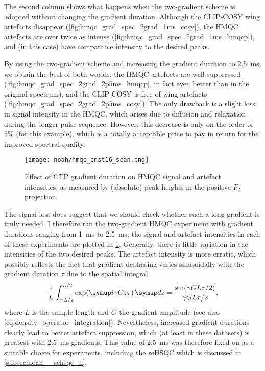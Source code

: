 The second column shows what happens when the two-gradient scheme is adopted without changing the gradient duration.
Although the CLIP-COSY wing artefacts disappear (\cref{fig:hmqc_grad_spec_2grad_1ms_cosy}), the HMQC artefacts are over twice as intense (\cref{fig:hmqc_grad_spec_2grad_1ms_hmqcp}), and (in this case) have comparable intensity to the desired peaks.

By using the two-gradient scheme and increasing the gradient duration to \qty{2.5}{\ms}, we obtain the best of both worlds: the HMQC artefacts are well-suppressed (\cref{fig:hmqc_grad_spec_2grad_2p5ms_hmqcp}, in fact even better than in the original spectrum), and the CLIP-COSY is free of wing artefacts (\cref{fig:hmqc_grad_spec_2grad_2p5ms_cosy}).
The only drawback is a slight loss in signal intensity in the HMQC, which arises due to diffusion and relaxation during the longer pulse sequence.
However, this decrease is only on the order of $5\%$ (for this example), which is a totally acceptable price to pay in return for the improved spectral quality.

\begin{figure}[!ht]
    \centering
    \texttt{[image: noah/hmqc\_cnst16\_scan.png]}%
    \caption[Effect of CTP gradient duration on \nitrogen{} HMQC signal and artefact intensities]{
        Effect of CTP gradient duration on \nitrogen{} HMQC signal and artefact intensities, as measured by (absolute) peak heights in the positive $F_2$ projection.
    }
    \label{fig:hmqc_cnst16}
\end{figure}

The signal loss does suggest that we should check whether such a long gradient is truly needed.
I therefore ran the two-gradient HMQC experiment with gradient durations ranging from \qty{1}{\ms} to \qty{2.5}{\ms}; the signal and artefact intensities in each of these experiments are plotted in \cref{fig:hmqc_cnst16}.
Generally, there is little variation in the intensities of the two desired peaks.
The artefact intensity is more erratic, which possibly reflects the fact that gradient dephasing varies sinusoidally with the gradient duration $\tau$ due to the spatial integral
\begin{equation}
    \label{eq:gradient_dephasing}
    \frac{1}{L} \int_{-L/2}^{L/2} \exp(\mi \gamma Gz\tau)\,\md z = \frac{\sin(\gamma G L\tau/2)}{\gamma GL\tau/2},
\end{equation}
where $L$ is the sample length and $G$ the gradient amplitude (see also \cref{eq:density_operator_integration}).
Nevertheless, increased gradient durations clearly lead to better artefact suppression, which (at least in these datasets) is greatest with \qty{2.5}{\ms} gradients.
This value of \qty{2.5}{\ms} was therefore fixed on as a suitable choice for \nitrogen{} experiments, including the seHSQC which is discussed in \cref{subsec:noah__sehsqc_n}.



